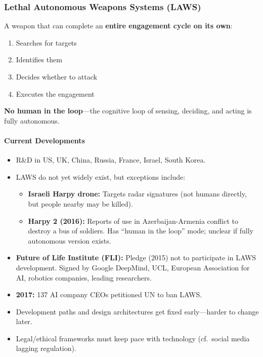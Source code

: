 \bigseparator

\subsubsection{Lethal Autonomous Weapons Systems (LAWS)}

\begin{defbox}[LAWS]
A weapon that can complete an \textbf{entire engagement cycle on its own}:
\begin{enumerate}
  \item Searches for targets
  \item Identifies them
  \item Decides whether to attack
  \item Executes the engagement
\end{enumerate}
\textbf{No human in the loop}---the cognitive loop of sensing, deciding, and acting is fully autonomous.
\end{defbox}

\paragraph*{Current Developments}

\begin{itemize}
  \item R\&D in US, UK, China, Russia, France, Israel, South Korea.
  \item LAWS do not yet widely exist, but exceptions include:
  \begin{itemize}
    \item \textbf{Israeli Harpy drone:} Targets radar signatures (not humans directly, but people nearby may be killed).
    \item \textbf{Harpy 2 (2016):} Reports of use in Azerbaijan-Armenia conflict to destroy a bus of soldiers. Has ``human in the loop'' mode; unclear if fully autonomous version exists.
  \end{itemize}
  \item \textbf{Future of Life Institute (FLI):} Pledge (2015) not to participate in LAWS development. Signed by Google DeepMind, UCL, European Association for AI, robotics companies, leading researchers.
  \item \textbf{2017:} 137 AI company CEOs petitioned UN to ban LAWS.
\end{itemize}

\begin{tipbox}
\begin{itemize}
  \item Development paths and design architectures get fixed early---harder to change later.
  \item Legal/ethical frameworks must keep pace with technology (cf.\ social media lagging regulation).
\end{itemize}
\end{tipbox}

